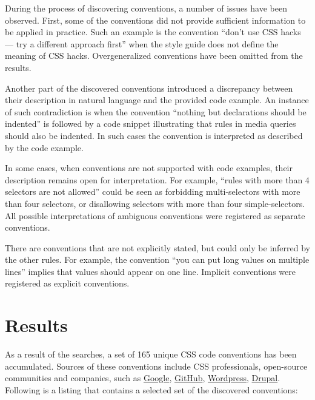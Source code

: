 \documentclass[parskip=full]{uvamscse}
\begin{document}
During the process of discovering conventions, a number of issues have been observed. First, some of
the conventions did not provide sufficient information to be applied in practice. Such an example is
the convention ``don’t use CSS hacks — try a different approach first'' when the style guide does
not define the meaning of CSS hacks. Overgeneralized conventions have been omitted from the results.

Another part of the discovered conventions introduced a discrepancy between their description in
natural language and the provided code example. An instance of such contradiction is when the
convention ``nothing but declarations should be indented'' is followed by a code snippet
illustrating that rules in media queries should also be indented. In such cases the convention is
interpreted as described by the code example.

In some cases, when conventions are not supported with code examples, their description remains open
for interpretation. For example, ``rules with more than 4 selectors are not allowed'' could be seen
as forbidding multi-selectors with more than four selectors, or disallowing selectors with more than
four simple-selectors. All possible interpretations of ambiguous conventions were registered as
separate conventions.

There are conventions that are not explicitly stated, but could only be inferred by the other rules.
For example, the convention ``you can put long values on multiple lines'' implies that values
should appear on one line. Implicit conventions were registered as explicit conventions.

\section{Results}

As a result of the searches, a set of 165 unique CSS code conventions has been accumulated. Sources
of these conventions include CSS professionals, open-source communities and companies, such as \href{https://google-styleguide.googlecode.com/svn/trunk/htmlcssguide.xml#Protocol}{Google}, \href{http://primercss.io/guidelines/#css}{GitHub}, \href{https://make.wordpress.org/core/handbook/best-practices/coding-standards/css/}{Wordpress}, \href{https://www.drupal.org/node/1887862}{Drupal}. Following is a listing that contains a selected set of the discovered conventions:
\end{document}
